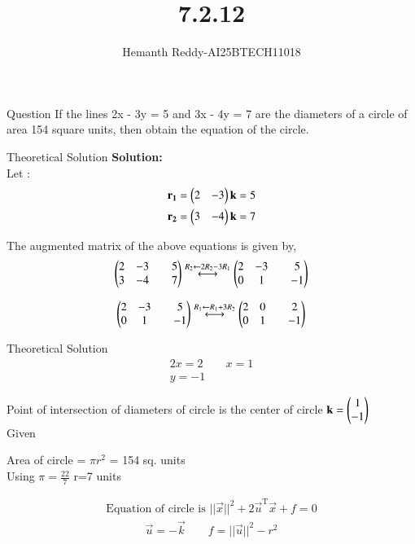 \documentclass{beamer}
\title %
{7.2.12}
\author %
{Hemanth Reddy-AI25BTECH11018}
\begin{document}
\frame{\titlepage}
\begin{frame}{Question}
If the lines 2x - 3y = 5 and 3x - 4y = 7 are the diameters of a circle of area 154
square units, then obtain the equation of the circle.
\end{frame}



\begin{frame}{Theoretical Solution}
\textbf{Solution:}\\

Let :
\begin{align}
    \mathbf{r_1} = \begin{pmatrix}2 & -3 \end{pmatrix}\mathbf{k} = 5 \\
    \mathbf{r_2} = \begin{pmatrix}3 & -4\end{pmatrix}\mathbf{k} = 7
\end{align}

The augmented matrix of the above equations is given by,\\
\begin{align}
    \begin{pmatrix} 2&-3&&5\\ 3&-4&&7\end{pmatrix} \stackrel{R_2 \leftarrow 2R_2 - 3R_1}{\longleftrightarrow}\begin{pmatrix} 2&-3&&5\\ 0&1&&-1\end{pmatrix} 
\end{align}

\begin{align}
    \begin{pmatrix}2&-3&&5\\ 0&1&&-1\end{pmatrix} \stackrel{R_1 \leftarrow R_1 +3R_2}{\longleftrightarrow}\begin{pmatrix} 2&0&&2\\ 0&1&&-1\end{pmatrix} 
\end{align}

\end{frame}

\begin{frame}{Theoretical Solution}
    \begin{align}
    2x=2 \qquad x=1\\
    y=-1 
\end{align}

Point of intersection of diameters of circle is the center of circle $\mathbf{k}=\begin{pmatrix}1\\-1\end{pmatrix}$\\
Given\\
\begin{center}
    Area of circle = $\pi r^2$ = 154 sq. units\\Using $\pi=\frac{22}{7}$  \qquad r=7 units\\
\end{center}

\begin{align}
    \text{Equation of circle is }||\vec{x}||^2 + 2\vec{u}^{\text{T}}\vec{x} + f = 0
\end{align}
\begin{align}
    \vec{u}=-\vec{k} \qquad f =||\vec{u}||^2 - r^2 
\end{align}


\end{frame}
\end{document}

